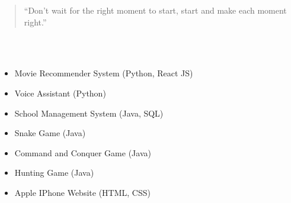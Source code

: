 \documentclass[10pt,a4paper,ragged2e,withhyper]{altacv}
\begin{document}
\begin{paracol}{2}





\switchcolumn


\begin{quote}
``Don't wait for the right moment to start, start and make each moment right.''
\end{quote}





\divider\smallskip



\\
\\

\divider\smallskip



\divider\smallskip


\begin{itemize}
\item Movie Recommender System (Python, React JS)
\item Voice Assistant (Python)
\item School Management System (Java, SQL)
\item Snake Game (Java)
\item Command and Conquer Game (Java)
\item Hunting Game (Java)
\item Apple IPhone Website (HTML, CSS)
\end{itemize}



\end{paracol}
\end{document}
